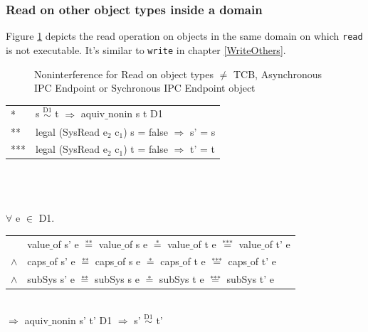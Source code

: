 \documentclass[pdftex,11pt,a4paper,twoside]{article}
\begin{document}
\subsubsection{Read on other object types inside a domain} 
Figure \ref{fig:ReadOthers} depicts the read operation on objects in the same domain on which \texttt{read} is not executable. It's similar to \texttt{write} in chapter \ref{WriteOthers}.
\begin{flushleft}
\begin{figure}[H]
\caption{Noninterference for Read on object types $\neq$ TCB, Asynchronous IPC Endpoint or Sychronous IPC Endpoint object}
\label{fig:ReadOthers}
\end{figure}
\end{flushleft}
\begin{tabular}{ll}
* & s $\overset{\text{D1}}{\sim}$ t $\Rightarrow$ aquiv$\_$nonin s t D1	\\ 
** & legal (SysRead e$_2$ c$_1$) s = false $\Rightarrow$ s' = s \\ 
*** & legal (SysRead e$_2$ c$_1$) t = false $\Rightarrow$ t' = t
\end{tabular} \\ \\ \\
$\forall$ e $\in$ D1. \\ 
\begin{tabular}{ll}
& value$\_$of s' e $\overset{\text{**}}{=}$ value$\_$of s e $\overset{\text{*}}{=}$ value$\_$of t e $\overset{\text{***}}{=}$ value$\_$of t' e \\
$\wedge$ & caps$\_$of s' e $\overset{\text{**}}{=}$ caps$\_$of s e $\overset{\text{*}}{=}$ caps$\_$of t e $\overset{\text{***}}{=}$ caps$\_$of t' e \\
$\wedge$ & subSys s' e $\overset{\text{**}}{=}$ subSys s e $\overset{\text{*}}{=}$ subSys t e $\overset{\text{***}}{=}$ subSys t' e
\end{tabular} \\
$\Rightarrow$ aquiv$\_$nonin s' t' D1 $\Rightarrow$ s' $\overset{\text{D1}}{\sim}$ t'
\end{document}
